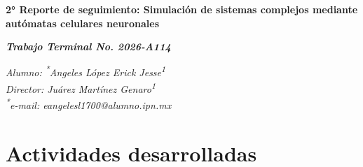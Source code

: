 \documentclass[letterpaper,10pt,oneside]{article}
\newcommand\authormark[1]{\textsuperscript{#1}}
\begin{document}
	
	\begin{center}
		\fontsize{14}{16}\selectfont\bfseries
		2° Reporte de seguimiento: 
		Simulación de sistemas complejos mediante autómatas celulares neuronales
	\end{center}
	
	\begin{center}
		\fontsize{14}{16}\selectfont\bfseries
		\textit{Trabajo Terminal No. 2026-A114}
	\end{center}
	
	\begin{center}
		\fontsize{12}{16}\selectfont
		\textit{Alumno: \authormark{*}Angeles López Erick Jesse\authormark{1}} \\
		\textit{Director: Juárez Martínez Genaro\authormark{1}} \\
		\textit{\authormark{*}e-mail: eangelesl1700@alumno.ipn.mx}
	\end{center}

	\section{Actividades desarrolladas}
	
\end{document}
